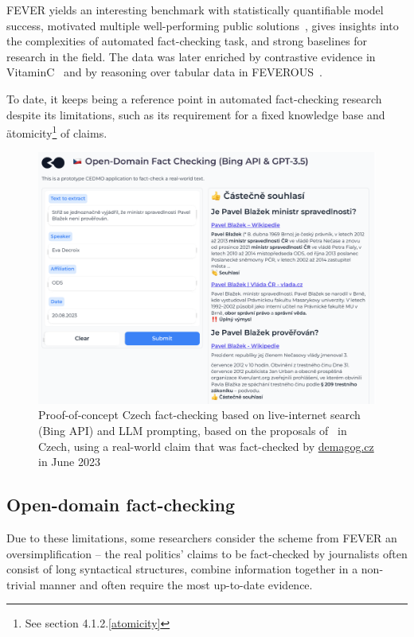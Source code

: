 FEVER yields an interesting benchmark with statistically quantifiable model success, motivated multiple well-performing public solutions~\cite{fever1,fever2}, gives insights into the complexities of automated fact-checking task, and strong baselines for research in the field. The data was later enriched by contrastive evidence in VitaminC~\cite{DBLP:journals/corr/abs-2103-08541} and by reasoning over tabular data in FEVEROUS~\cite{aly2021feverous}.

To date, it keeps being a reference point in automated fact-checking research despite its limitations, such as its requirement for a fixed knowledge base and \"{atomicity}\footnote{See section 4.1.2.\ref{atomicity}} of claims.

\begin{figure}
    \includegraphics[width=14cm]{fig/bing.pdf}
    \caption{Proof-of-concept Czech fact-checking based on live-internet search (Bing API) and LLM prompting, based on the proposals of~\cite{bing} in Czech, using a real-world claim that was fact-checked by \href{https://demagog.cz/vyrok/22849}{\url{demagog.cz}} in June 2023}
    \label{fig:bing}
\end{figure}

\subsection{Open-domain fact-checking}
Due to these limitations, some researchers consider the scheme from FEVER an oversimplification -- the real politics' claims to be fact-checked by journalists often consist of long syntactical structures, combine information together in a non-trivial manner and often require the most up-to-date evidence. 

